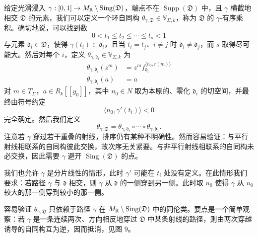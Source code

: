 \begin{construction}
给定光滑浸入 $\gamma:[0,1]\to M_{\mathbb{R}}\setminus\operatorname{Sing}(\mathfrak D)$，端点不在 $\operatorname{Supp}(\mathfrak D)$ 中，且 $\gamma$ 横截地相交 $\mathfrak D$ 的元素，我们可以定义一个环自同构 $\theta_{\gamma,\mathfrak D}\in\mathbb V_{\Sigma,k}$，称为 $\mathfrak D$ 的 $\gamma$-有序乘积。确切地说，可以找到数
\[
  0<t_1\le t_2\le\cdots\le t_s<1
\]
与元素 $\mathfrak d_i\in\mathfrak D$，使得 $\gamma(t_i)\in\mathfrak d_i$，且当 $t_i=t_j$、$i\ne j$ 时 $\mathfrak d_i\ne\mathfrak d_j$，而 $s$ 取得尽可能大。然后对每个 $i$，定义 $\theta_{\gamma,\mathfrak d_i}\in\mathbb V_{\Sigma,k}$ 为
\[
  \begin{aligned}
    \theta_{\gamma,\mathfrak d_i}(z^m)&=z^mf_{\mathfrak d_i}^{\langle n_0,r(m)\rangle}\\
    \theta_{\gamma,\mathfrak d_i}(a)&=a
  \end{aligned}
\]
对 $m\in T_\Sigma$，$a\in R_k[[y_0]]$，其中 $n_0\in N$ 取为本原的、零化 $\mathfrak d_i$ 的切空间，并最终由符号约定
\[
  \langle n_0,\gamma'(t_i)\rangle<0
\]
完全确定。然后我们定义
\[
  \theta_{\gamma,\mathfrak D}=\theta_{\gamma,\mathfrak d_s}\circ\cdots\circ\theta_{\gamma,\mathfrak d_1}.
\]
注意若 $\gamma$ 穿过若干重叠的射线，排序仍有某种不明确性。然而容易验证：与平行射线相联系的自同构彼此交换，故次序无关紧要。与非平行射线相联系的自同构未必交换，因此需要 $\gamma$ 避开 $\operatorname{Sing}(\mathfrak D)$ 的点。

我们也允许 $\gamma$ 是分片线性的情形，此时 $\gamma'$ 可能在 $t_i$ 处没有定义。在此情形我们要求：若路径 $\gamma$ 与 $\mathfrak d$ 相交，则 $\gamma$ 从 $\mathfrak d$ 的一侧穿到另一侧。此时取 $n_0$ 使得 $\gamma$ 从 $n_0$ 较大的那一侧穿到较小的那一侧。

容易验证 $\theta_{\gamma,\mathfrak D}$ 只依赖于路径 $\gamma$ 在 $M_{\mathbb{R}}\setminus\operatorname{Sing}(\mathfrak D)$ 中的同伦类。要点是一个简单观察：若 $\gamma$ 是一条连续两次、方向相反地穿过 $\mathfrak D$ 中某条射线的路径，则由两次穿越诱导的自同构互为逆，因而抵消，见图 9。
\end{construction}

